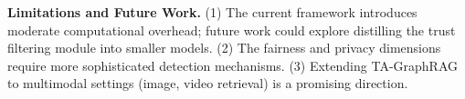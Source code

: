 \documentclass[11pt,a4paper]{article}
\begin{document}
\textbf{Limitations and Future Work.} (1) The current framework introduces moderate computational overhead; future work could explore distilling the trust filtering module into smaller models. (2) The fairness and privacy dimensions require more sophisticated detection mechanisms. (3) Extending TA-GraphRAG to multimodal settings (image, video retrieval) is a promising direction.



\end{document}
